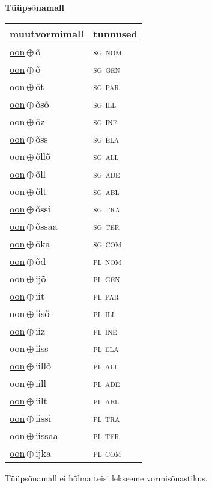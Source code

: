 

\vspace{3.5em}
\noindent \begin{minipage}{\textwidth}
\noindent \textbf{Tüüpsõnamall \,}\\

\begin{sideways}
\begin{tabular}{l l}
muutvormimall & tunnused \\
\hline
\underline{oon}\,$\oplus$\,õ & \textsc{ sg nom } \\
\underline{oon}\,$\oplus$\,õ & \textsc{ sg gen } \\
\underline{oon}\,$\oplus$\,õt & \textsc{ sg par } \\
\underline{oon}\,$\oplus$\,õsõ & \textsc{ sg ill } \\
\underline{oon}\,$\oplus$\,õz & \textsc{ sg ine } \\
\underline{oon}\,$\oplus$\,õss & \textsc{ sg ela } \\
\underline{oon}\,$\oplus$\,õllõ & \textsc{ sg all } \\
\underline{oon}\,$\oplus$\,õll & \textsc{ sg ade } \\
\underline{oon}\,$\oplus$\,õlt & \textsc{ sg abl } \\
\underline{oon}\,$\oplus$\,õssi & \textsc{ sg tra } \\
\underline{oon}\,$\oplus$\,õssaa & \textsc{ sg ter } \\
\underline{oon}\,$\oplus$\,õka & \textsc{ sg com } \\
\underline{oon}\,$\oplus$\,õd & \textsc{ pl nom } \\
\underline{oon}\,$\oplus$\,ijõ & \textsc{ pl gen } \\
\underline{oon}\,$\oplus$\,iit & \textsc{ pl par } \\
\underline{oon}\,$\oplus$\,iisõ & \textsc{ pl ill } \\
\underline{oon}\,$\oplus$\,iiz & \textsc{ pl ine } \\
\underline{oon}\,$\oplus$\,iiss & \textsc{ pl ela } \\
\underline{oon}\,$\oplus$\,iillõ & \textsc{ pl all } \\
\underline{oon}\,$\oplus$\,iill & \textsc{ pl ade } \\
\underline{oon}\,$\oplus$\,iilt & \textsc{ pl abl } \\
\underline{oon}\,$\oplus$\,iissi & \textsc{ pl tra } \\
\underline{oon}\,$\oplus$\,iissaa & \textsc{ pl ter } \\
\underline{oon}\,$\oplus$\,ijka & \textsc{ pl com } \\
\end{tabular}
\end{sideways}
\label{tab:tüüpsõnamall-oonõ}

\end{minipage}

 
\vspace{1em}
\noindent Tüüpsõnamall  ei hõlma teisi lekseeme vormi\-sõnastikus.
